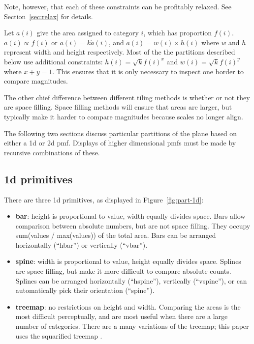 \documentclass[letterpaper,oneside]{scrartcl}
\begin{document}
Note, however, that each of these constraints can be profitably relaxed.  See Section~\ref{sec:relax} for details.

Let $a(i)$ give the area assigned to category $i$, which has proportion $f(i)$.  $a(i) \propto f(i)$ or $a(i) = k \dot a(i)$, and $a(i) = w(i) \times h(i)$ where $w$ and $h$ represent width and height respectively.  Most of the the partitions described below use additional constraints: $h(i) = \sqrt{k} f(i)^x$ and $w(i) = \sqrt{k} f(i)^y$ where $x + y = 1$.  This ensures that it is only necessary to inspect one border to compare magnitudes.

The other chief difference between different tiling methods is whether or not they are space filling.  Space filling methods will ensure that areas are larger, but typically make it harder to compare magnitudes because scales no longer align.

The following two sections discuss particular partitions of the plane based on either a 1d or 2d pmf.  Displays of higher dimensional pmfs must be made by recursive combinations of these.  

\subsection{1d primitives}

There are three 1d primitives, as displayed in Figure~\ref{fig:part-1d}:

\begin{itemize}
  \item {\bf bar}: height is proportional to value, width equally divides space. Bars allow comparison between absolute numbers, but are not space filling.  They occupy sum(values / max(values)) of the total area.  Bars can be arranged horizontally (``hbar'') or vertically (``vbar'').

  \item {\bf spine}: width is proportional to value, height equally divides space. Splines are space filling, but make it more difficult to compare absolute counts.  Splines can be arranged horizontally (``hspine''),  vertically (``vspine''), or can automatically pick their orientation (``spine'').

  \item {\bf treemap}: no restrictions on height and width. Comparing the areas is the most difficult perceptually, and are most useful when there are a large number of categories.  There are a many variations of the treemap; this paper uses the squarified treemap \citep{bruls:1999}.

\end{itemize}
\end{document}
